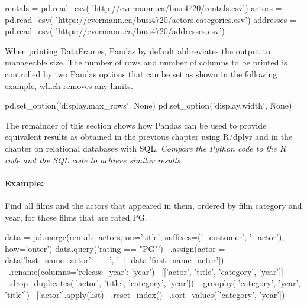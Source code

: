 \begin{pythoncode}
rentals = pd.read_csv(
     'http://evermann.ca/busi4720/rentals.csv')
actors = pd.read_csv(
     'https://evermann.ca/busi4720/actors.categories.csv')
addresses = pd.read_csv(
     'https://evermann.ca/busi4720/addresses.csv')
\end{pythoncode}




\noindent When printing DataFrames, Pandas by default abbreviates the output to manageable size. The number of rows and number of columns to be printed is controlled by two Pandas options that can be set as shown in the following example, which removes any limits.

\begin{pythoncode}
pd.set_option('display.max_rows', None)
pd.set_option('display.width', None)
\end{pythoncode}

The remainder of this section shows how Pandas can be used to provide equivalent results as obtained in the previous chapter using R/dplyr and in the chapter on relational databases with SQL. \emph{Compare the Python code to the R code and the SQL code to achieve similar results.}

\paragraph*{Example:} Find all films and the actors that appeared in them, ordered by film category and year, for those films that are rated PG.

\begin{pythoncode}
data = pd.merge(rentals, actors, on='title', 
         suffixes=('_customer', '_actor'), how='outer')
data.query('rating == "PG"') \
    .assign(actor = data['last_name_actor'] + \
                   ', ' + data['first_name_actor']) \
    .rename(columns={'release_year': 'year'}) \
    [['actor', 'title', 'category', 'year']] \
    .drop_duplicates(['actor', 'title', 'category', 'year']) \
    .groupby(['category', 'year', 'title']) \
    ['actor'].apply(list) \
    .reset_index() \
    .sort_values(['category', 'year']) \
\end{pythoncode}

